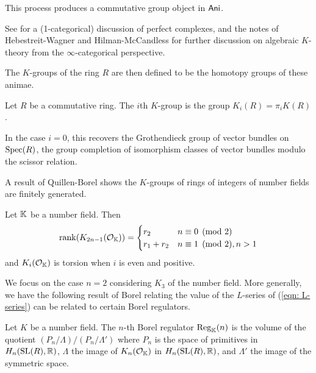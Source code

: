 This process produces a commutative group object in $\mathsf{Ani}$.
\begin{remark}
    See \cite[\href{https://stacks.math.columbia.edu/tag/0656}{Tag 0656}]{stacks-project} for a (1-categorical) discussion of perfect complexes, and the notes of Hebestreit-Wagner \cite{HW21} and Hilman-McCandless \cite{HM24} for further discussion on algebraic $K$-theory from the $\infty$-categorical perspective. 
\end{remark}
The $K$-groups of the ring $R$ are then defined to be the homotopy groups of these animae.
\begin{definition}\label{def: K-groups}
    Let $R$ be a commutative ring. The $i$th $K$-group is the group $K_{i}(R)=\pi_{i}K(R)$.
\end{definition}
\begin{remark}
    In the case $i=0$, this recovers the Grothendieck group of vector bundles on $\operatorname{Spec}(R)$, the group completion of isomorphism classes of vector bundles modulo the scissor relation. 
\end{remark}
A result of Quillen-Borel shows the $K$-groups of rings of integers of number fields are finitely generated. 
\begin{theorem}
    Let $\mathbb{K}$ be a number field. Then 
    $$\mathrm{rank}(K_{2n-1}(\mathcal{O}_{\mathbb{K}}))=\begin{cases}
        r_{2} & n\equiv0\pmod{2} \\ 
        r_{1}+r_{2} & n\equiv1\pmod{2}, n>1
    \end{cases}$$
    and $K_{i}(\mathcal{O}_{\mathbb{K}})$ is torsion when $i$ is even and positive. 
\end{theorem}
We focus on the case $n=2$ considering $K_{3}$ of the number field. More generally, we have the following result of Borel relating the value of the $L$-series of (\ref{eqn: L-series}) can be related to certain Borel regulators. 
\begin{definition}\label{def: Borel regulator}
    Let $K$ be a number field. The $n$-th Borel regulator $\mathrm{Reg}_{\mathbb{K}}(n)$ is the volume of the quotient $(P_{n}/\Lambda)/(P_{n}/\Lambda')$ where $P_{n}$ is the space of primitives in $H_{n}(\mathrm{SL}(R),\mathbb{R})$, $\Lambda$ the image of $K_{n}(\mathcal{O}_{\mathbb{K}})$ in $H_{n}(\mathrm{SL}(R),\mathbb{R})$, and $\Lambda'$ the image of the symmetric space. 
\end{definition}
